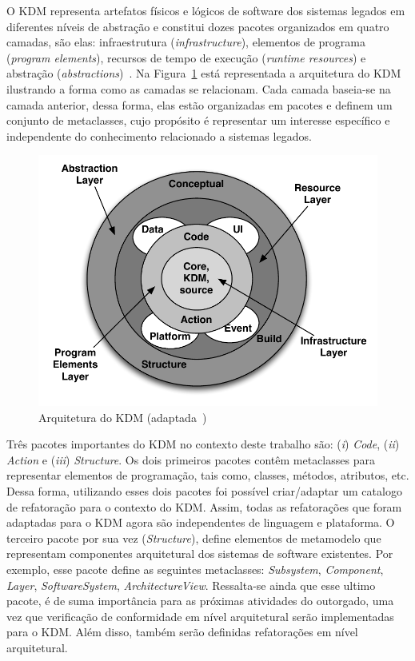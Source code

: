 O KDM representa artefatos físicos e lógicos de software dos sistemas legados em diferentes níveis de abstração e constitui dozes pacotes organizados em quatro camadas, são elas: infraestrutura (\textit{infrastructure}), elementos de programa (\textit{program elements}), recursos de tempo de execução (\textit{runtime resources}) e abstração (\textit{abstractions})~\citep{PerezCastillo:2011jo}. Na Figura~\ref{fig:KDMArchitecture} está representada a arquitetura do KDM ilustrando a forma como as camadas se relacionam. Cada camada baseia-se na camada anterior, dessa forma, elas estão organizadas em pacotes e definem um conjunto de metaclasses, cujo propósito é representar um interesse específico e independente do conhecimento relacionado a sistemas legados.

\begin{figure}[!ht]
\centering
  \includegraphics[scale=0.65]{figuras/Layers_packages_and_separations_of_concerns_in_KDM}
\caption{Arquitetura do KDM (adaptada~\citep{OMGADM})}
\label{fig:KDMArchitecture}
\end{figure}

Três pacotes importantes do KDM no contexto deste trabalho são: (\textit{i}) \textit{Code}, (\textit{ii}) \textit{Action} e (\textit{iii}) \textit{Structure}. Os dois primeiros pacotes contêm metaclasses para representar elementos de programação, tais como, classes, métodos, atributos, etc. Dessa forma, utilizando esses dois pacotes foi possível criar/adaptar um catalogo de refatoração para o contexto do KDM. Assim, todas as refatorações que foram adaptadas para o KDM agora são independentes de linguagem e plataforma. O terceiro pacote por sua vez (\textit{Structure}), define elementos de metamodelo que representam componentes arquitetural dos sistemas de software existentes. Por exemplo, esse pacote define as seguintes metaclasses: \textit{Subsystem}, \textit{Component}, \textit{Layer}, \textit{SoftwareSystem}, \textit{ArchitectureView}. Ressalta-se ainda que esse ultimo pacote, é de suma importância para as próximas atividades do outorgado, uma vez que verificação de conformidade em nível arquitetural serão implementadas para o KDM. Além disso, também serão definidas refatorações em nível arquitetural.

